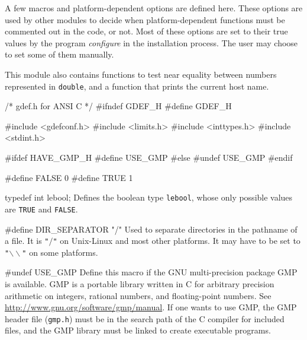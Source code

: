 
A few macros and platform-dependent options are defined here.
These options are used by other modules to decide when 
platform-dependent functions must be commented out in the code, or not.
Most of these options are set to their true values by the program
{\it configure} in the installation process. The user may choose
to set some of them manually.
\iffalse
Each option must either be left undefined (i.e., the corresponding
macro is put to false, using ``\texttt{\#undef}) 
or can be given its proper value (using ``\texttt{\#define} commands).
An option can be defined only under certain conditions.
For example, \texttt{USE\_GMP} can be defined only if GMP
is available, \texttt{HAVE\_ERF} can be defined only if the Unix \texttt{erf}
function is available, and so on.
\fi
This module also contains functions to test near equality between numbers represented in 
\texttt{double}, and a function that prints the current host name.

\code\hide
/* gdef.h  for ANSI C */
#ifndef GDEF_H
#define GDEF_H

#include <gdefconf.h>
#include <limits.h>
#include <inttypes.h>
#include <stdint.h>

#ifdef HAVE_GMP_H
#define USE_GMP
#else
#undef USE_GMP
#endif
\endhide
\endcode


\code
#define FALSE 0
#define TRUE 1

typedef int lebool;
\endcode
  \tab Defines the boolean type \texttt{lebool}, whose only possible values are
  {\tt TRUE} and {\tt FALSE}.
 \endtab
\code

#define DIR_SEPARATOR "/"
\endcode
  \tab Used to separate directories in the pathname of a file.
  It is \texttt{"$/$"} on {Unix-Linux} and most other platforms. 
  It may have to be set to \texttt{"$\backslash\backslash$"} on some platforms.
 \endtab
\code

#undef USE_GMP
\endcode
  \tab  Define this macro if the GNU multi-precision package GMP
  is available.  GMP is a portable library written in C for arbitrary
  precision arithmetic on integers, rational numbers, and floating-point numbers. 
	See \url{http://www.gnu.org/software/gmp/manual}. 
	If one wants to use GMP, the GMP header file (\texttt{gmp.h}) must be in the  search path 
  of the C compiler for included files, and the GMP library must be 
  linked to create executable programs.
 \endtab
\iffalse   %
\code

